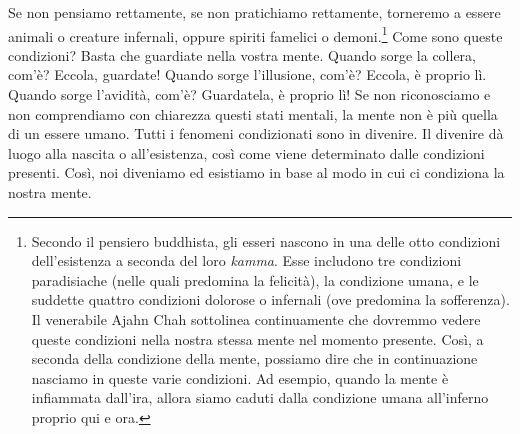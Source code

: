 Se non pensiamo rettamente, se non pratichiamo rettamente, torneremo a
essere animali o creature infernali, oppure spiriti famelici o
demoni.\footnote{Secondo il pensiero buddhista, gli esseri nascono in
  una delle otto condizioni dell'esistenza a seconda del loro
  \emph{kamma}. Esse includono tre condizioni paradisiache (nelle quali
  predomina la felicità), la condizione umana, e le suddette quattro
  condizioni dolorose o infernali (ove predomina la sofferenza). Il
  venerabile Ajahn Chah sottolinea continuamente che dovremmo vedere
  queste condizioni nella nostra stessa mente nel momento presente.
  Così, a seconda della condizione della mente, possiamo dire che in
  continuazione nasciamo in queste varie condizioni. Ad esempio, quando
  la mente è infiammata dall'ira, allora siamo caduti dalla condizione
  umana all'inferno proprio qui e ora.} Come sono queste condizioni?
Basta che guardiate nella vostra mente. Quando sorge la collera, com'è?
Eccola, guardate! Quando sorge l'illusione, com'è? Eccola, è proprio lì.
Quando sorge l'avidità, com'è? Guardatela, è proprio lì! Se non
riconosciamo e non comprendiamo con chiarezza questi stati mentali, la
mente non è più quella di un essere umano. Tutti i fenomeni condizionati
sono in divenire. Il divenire dà luogo alla nascita o all'esistenza,
così come viene determinato dalle condizioni presenti. Così, noi
diveniamo ed esistiamo in base al modo in cui ci condiziona la nostra
mente.

